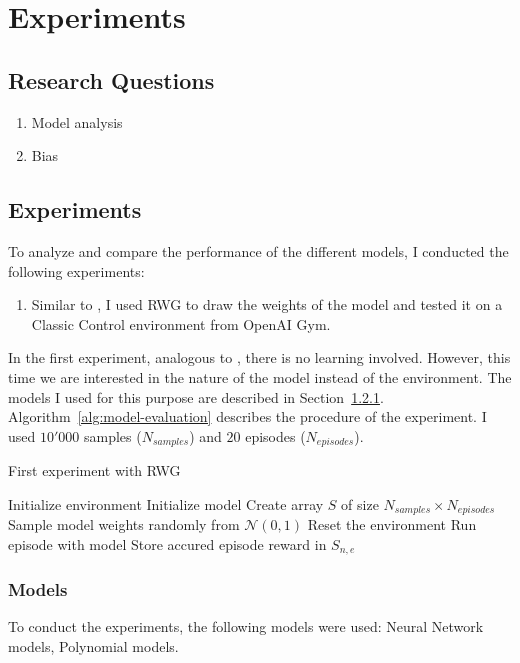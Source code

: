 
\chapter{Experiments}
\label{ch:experiments}

\section{Research Questions}
\begin{enumerate}
  \item Model analysis
  \item Bias
\end{enumerate}

\section{Experiments}
To analyze and compare the performance of the different models, I conducted the following experiments:
\begin{enumerate}
  \item Similar to \citet{oller_analyzing_2020}, I used RWG to draw the weights of the model and tested it on a Classic Control environment from OpenAI Gym.
\end{enumerate}

In the first experiment, analogous to \citet{oller_analyzing_2020}, there is no learning involved. However, this time we are interested in the nature of the model instead of the environment. The models I used for this purpose are described in Section~\ref{ssec:models}.
Algorithm~\ref{alg:model-evaluation} describes the procedure of the experiment. I used $10'000$ samples ($N_{samples}$) and $20$ episodes ($N_{episodes}$).
\begin{algorithm}
\caption{First experiment with RWG}
\begin{algorithmic}[1]
\State Initialize environment
\State Initialize model
\State Create array $S$ of size $N_{samples} \times N_{episodes}$
    \State Sample model weights randomly from $\mathcal{N}(0,1)$
      \State Reset the environment
      \State Run episode with model
      \State Store accured episode reward in $S_{n,e}$
    \EndFor
\EndFor
\end{algorithmic}
\label{alg:model-evaluation}
\end{algorithm}

\subsection{Models}
\label{ssec:models}
To conduct the experiments, the following models were used: Neural Network models, Polynomial models.

